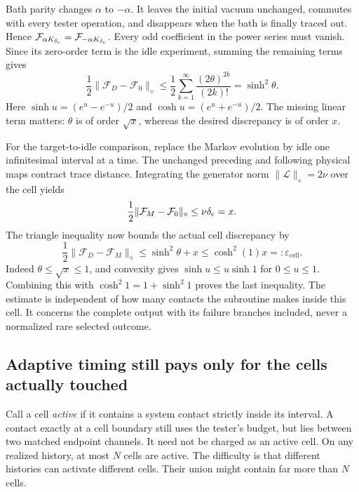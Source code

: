 \documentclass[11pt,a4paper]{article}
\numberwithin{equation}{section}
\theoremstyle{remark}
\begin{document}
Bath parity changes $\alpha$ to $-\alpha$. It leaves the initial
vacuum unchanged, commutes with every tester operation, and disappears
when the bath is finally traced out. Hence
$\mathcal F_{\alpha K_{\delta_{\rm c}}}=\mathcal F_{-\alpha K_{\delta_{\rm c}}}$. Every odd coefficient
in the power series must vanish. Since its zero-order term is the idle
experiment, summing the remaining terms gives
\begin{equation}
 \frac12\|\mathcal F_D-\mathcal F_0\|_\diamond
 \le\frac12\sum_{k=1}^\infty\frac{(2\theta)^{2k}}{(2k)!}
 =\sinh^2\theta.
 \label{sim:even-bound}
\end{equation}
Here $\sinh u=(e^u-e^{-u})/2$ and $\cosh u=(e^u+e^{-u})/2$.
The missing linear term matters: $\theta$ is of order $\sqrt{x}$,
whereas the desired discrepancy is of order $x$.

For the target-to-idle comparison, replace the Markov evolution by idle
one infinitesimal interval at a time. The unchanged preceding and following
physical maps contract trace distance. Integrating the generator norm
$\|\mathcal L\|_\diamond=2\nu$ over the cell yields
\begin{equation}
 \frac12\|\mathcal F_M-\mathcal F_0\|_\diamond\le\nu \delta_{\rm c}=x.
 \label{sim:markov-idle}
\end{equation}
The triangle inequality now bounds the actual cell discrepancy by
\begin{equation}
 \frac12\|\mathcal F_D-\mathcal F_M\|_\diamond
 \le\sinh^2\theta+x
 \le\cosh^2(1)x=:\varepsilon_{\mathrm{cell}}.
 \label{sim:complete-cell-error}
\end{equation}
Indeed $\theta\le\sqrt{x}\le1$, and convexity gives
$\sinh u\le u\sinh1$ for $0\le u\le1$. Combining this with
$\cosh^2 1=1+\sinh^2 1$ proves the last inequality.
The estimate is independent of how many contacts the subroutine makes
inside this cell. It concerns the complete output with its failure
branches included, never a normalized rare selected outcome.

\subsection{Adaptive timing still pays only for the cells actually touched}
\label{sim:adaptive}

Call a cell \emph{active} if it contains a system contact strictly inside
its interval. A contact exactly at a cell boundary still uses the tester's
budget, but lies between two matched endpoint channels. It need not be
charged as an active cell. On any realized history, at most $N$ cells
are active. The difficulty is that different histories can activate
different cells. Their union might contain far more than $N$ cells.
\end{document}
